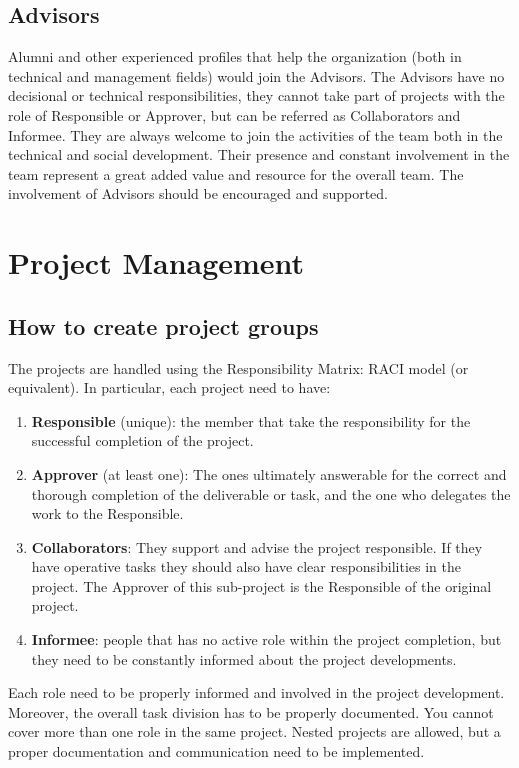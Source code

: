 \documentclass[graybox]{svmult}
\begin{document}
\subsection{Advisors}
Alumni and other experienced profiles that help the organization (both in technical and management fields) would join the Advisors. The Advisors have no decisional or technical responsibilities, they cannot take part of projects with the role of Responsible or Approver, but can be referred as Collaborators and Informee. They are always welcome to join the activities of the team both in the technical and social development. Their presence and constant involvement in the team represent a great added value and resource for the overall team. The involvement of Advisors should be encouraged and supported.

\section{Project Management}
\label{sec:3}

\subsection{How to create project groups}
The projects are handled using the Responsibility Matrix: RACI model (or equivalent). 
In particular, each project need to have:
\begin{enumerate}
\item \textbf{Responsible} (unique): the member that take the responsibility for the successful completion of the project.
\item \textbf{Approver} (at least one): The ones ultimately answerable for the correct and thorough completion of the deliverable or task, and the one who delegates the work to the Responsible.
\item \textbf{Collaborators}: They support and advise the project responsible. If they have operative tasks they should also have clear responsibilities in the project. The Approver of this sub-project is the Responsible of the original project.
\item \textbf{Informee}: people that has no active role within the project completion, but they need to be constantly informed about the project developments.
\end{enumerate}
Each role need to be properly informed and involved in the project development. Moreover, the overall task division has to be properly documented. You cannot cover more than one role in the same project.
Nested projects are allowed, but a proper documentation and communication need to be implemented.
\end{document}
